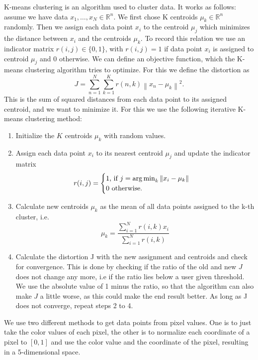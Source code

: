 K-means clustering is an algorithm used to cluster data. It works as follows: assume we have data $x_1,\ldots,x_N \in \mathbb{R}^n$. We first chose K centroids $\mu_k \in \mathbb{R}^n$ randomly. Then we assign each data point $x_i$ to the centroid $\mu_j$ which minimizes the distance between $x_i$ and the centroids $\mu_k$. To record this relation we use an indicator matrix $r(i,j) \in \{0,1\}$, with $r(i,j)=1$ if data point $x_i$ is assigned to centroid $\mu_j$ and $0$ otherwise. We can define an objective function, which the K-means clustering algorithm tries to optimize. For this we define the distortion as
\begin{equation}
	J = \sum_{n=1}^{N} \sum_{k=1}^{K} r(n,k) \left\|x_n-\mu_k\right\|^2.
\end{equation}
This is the sum of squared distances from each data point to its assigned centroid, and we want to minimize it. For this we use the following iterative K-means clustering method:
\begin{enumerate}
\item Initialize the $K$ centroids $\mu_k$ with random values.
\item Assign each data point $x_i$ to its nearest centroid $\mu_j$ and update the indicator matrix
\[
	r(i,j)= \begin{cases}
               1 \text{, if } j = \operatorname*{arg\,min}_k\left\|x_i-\mu_k\right\| \\

             0 \text{ otherwise.}
            \end{cases}
\]
\item Calculate new centroids $\mu_k$ as the mean of all data points assigned to the k-th cluster, i.e. 
\[
	\mu_k = \frac{\sum\limits_{i=1}^N r(i,k) x_i}{\sum\limits_{i=1}^N r(i,k)}
\]
\item Calculate the distortion J with the new assignment and centroids and check for convergence. This is done by checking if the ratio of the old and new $J$ does not change any more, i.e if the ratio lies below a user given threshold. We use the absolute value of 1 minus the ratio, so that the algorithm can also make $J$ a little worse, as this could make the end result better. As long as J does not converge, repeat steps 2 to 4.
\end{enumerate} 

We use two different methods to get data points from pixel values. One is to just take the color values of each pixel, the other is to normalize each coordinate of a pixel to $[0, 1]$ and use the color value and the coordinate of the pixel, resulting in a 5-dimensional space.

